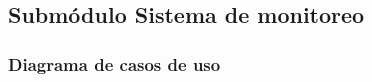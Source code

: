 \subsection{Submódulo Sistema de monitoreo}
\subsubsection{Diagrama de casos de uso}







%
%
%
%
%
%
%
%